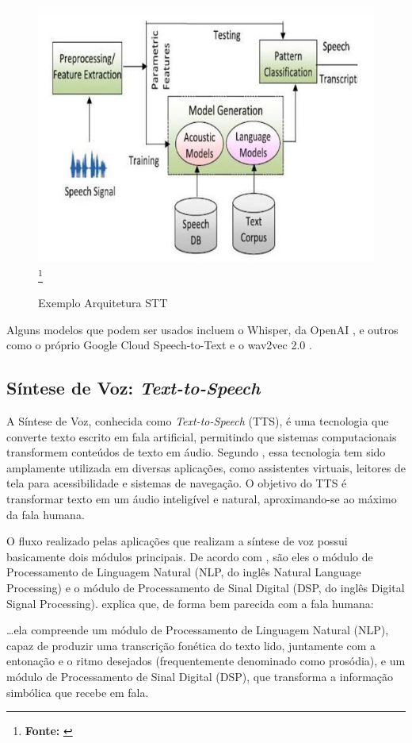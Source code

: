 \begin{figure}[!h]
     \caption{Exemplo Arquitetura STT}
     \centering
     \includegraphics[width=0.7\linewidth]{imagens/stt.png}
     \label{fig:4}
     \footnote{\textbf{Fonte:} \cite{trivedi2018}}
\end{figure}

Alguns modelos que podem ser usados incluem o Whisper, da OpenAI \cite{radford2023}, e outros como o próprio Google Cloud Speech-to-Text e o wav2vec 2.0 \cite{Baevski2020}.

\subsection{Síntese de Voz: \textit{Text-to-Speech}}

A Síntese de Voz, conhecida como \textit{Text-to-Speech} (TTS), é uma tecnologia que converte texto escrito em fala artificial, permitindo que sistemas computacionais transformem conteúdos de texto em áudio. Segundo , essa tecnologia tem sido amplamente utilizada em diversas aplicações, como assistentes virtuais, leitores de tela para acessibilidade e sistemas de navegação. O objetivo do TTS é transformar texto em um áudio inteligível e natural, aproximando-se ao máximo da fala humana.

O fluxo realizado pelas aplicações que realizam a síntese de voz possui basicamente dois módulos principais. De acordo com , são eles o módulo de Processamento de Linguagem Natural (NLP, do inglês Natural Language Processing) e o módulo de Processamento de Sinal Digital (DSP, do inglês Digital Signal Processing).  explica que, de forma bem parecida com a fala humana:

\begin{citacao}
    …ela compreende um módulo de Processamento de Linguagem Natural (NLP), capaz de produzir uma transcrição fonética do texto lido, juntamente com a entonação e o ritmo desejados (frequentemente denominado como prosódia), e um módulo de Processamento de Sinal Digital (DSP), que transforma a informação simbólica que recebe em fala.
\end{citacao}


